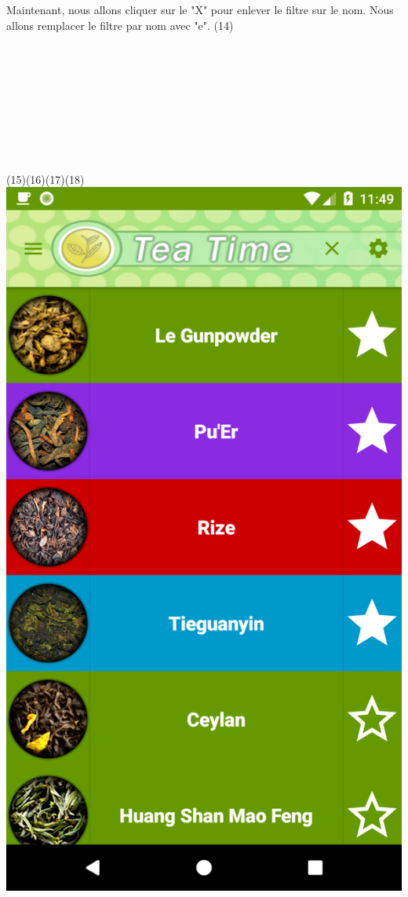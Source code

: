 \documentclass[a4paper,12pt]{article}
\begin{document}
\begin{spacing}{1}
	Maintenant, nous allons cliquer sur le "X" pour enlever le filtre sur le nom. Nous allons remplacer le filtre par nom avec "e". (14)
	\\\\\\\\\\\\\\\\\\\\
	(15)\space\space\space\space\space\space\space\space\space\space\space\space\space\space\space\space\space\space\space\space\space\space\space(16)\space\space\space\space\space\space\space\space\space\space\space\space\space\space\space\space\space\space\space\space\space\space\space(17)\space\space\space\space\space\space\space\space\space\space\space\space\space\space\space\space\space\space\space\space\space\space\space(18)\\
	\includegraphics*[scale=0.1]{Screenshot/15.png}    

\end{spacing}
\end{document}
